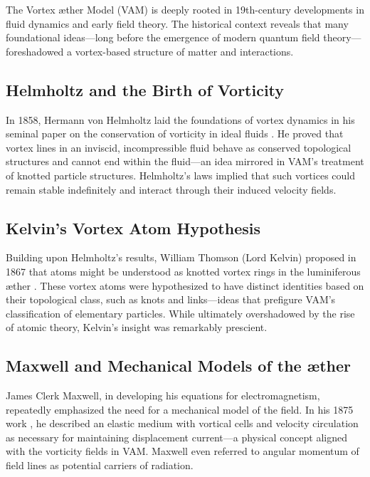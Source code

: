     The Vortex \ae ther Model (VAM) is deeply rooted in 19th-century developments in fluid dynamics and early field theory. The historical context reveals that many foundational ideas—long before the emergence of modern quantum field theory—foreshadowed a vortex-based structure of matter and interactions.


    \subsection{Helmholtz and the Birth of Vorticity}


    In 1858, Hermann von Helmholtz laid the foundations of vortex dynamics in his seminal paper on the conservation of vorticity in ideal fluids \cite{helmholtz1858}. He proved that vortex lines in an inviscid, incompressible fluid behave as conserved topological structures and cannot end within the fluid—an idea mirrored in VAM's treatment of knotted particle structures. Helmholtz’s laws implied that such vortices could remain stable indefinitely and interact through their induced velocity fields.


    \subsection{Kelvin's Vortex Atom Hypothesis}


    Building upon Helmholtz’s results, William Thomson (Lord Kelvin) proposed in 1867 that atoms might be understood as knotted vortex rings in the luminiferous \ae ther \cite{kelvin1867}. These vortex atoms were hypothesized to have distinct identities based on their topological class, such as knots and links—ideas that prefigure VAM’s classification of elementary particles. While ultimately overshadowed by the rise of atomic theory, Kelvin’s insight was remarkably prescient.


    \subsection{Maxwell and Mechanical Models of the \ae ther}


    James Clerk Maxwell, in developing his equations for electromagnetism, repeatedly emphasized the need for a mechanical model of the field. In his 1875 work \cite{maxwell1875}, he described an elastic medium with vortical cells and velocity circulation as necessary for maintaining displacement current—a physical concept aligned with the vorticity fields in VAM. Maxwell even referred to angular momentum of field lines as potential carriers of radiation.


